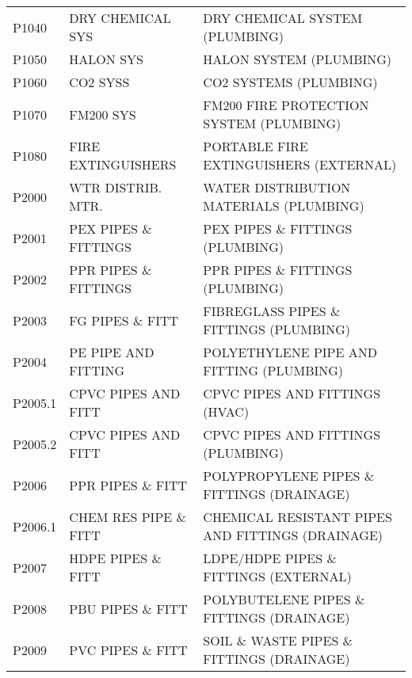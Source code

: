 \begin{longtable}[l]{l%
                  l|%
                  l|}
\rowcolor{thetableheadbgcolor!0.25!white} P1040       & DRY CHEMICAL SYS   & DRY CHEMICAL SYSTEM (PLUMBING)   \\
\rowcolor{thetableheadbgcolor!0.25!white} P1050       & HALON SYS   & HALON SYSTEM (PLUMBING)   \\
\rowcolor{thetableheadbgcolor!0.25!white} P1060       & CO2 SYSS   & CO2 SYSTEMS (PLUMBING)   \\
\rowcolor{thetableheadbgcolor!0.25!white} P1070       & FM200  SYS   & FM200 FIRE PROTECTION SYSTEM (PLUMBING)   \\
\rowcolor{thetableheadbgcolor!0.25!white} P1080       & FIRE EXTINGUISHERS   & PORTABLE FIRE EXTINGUISHERS (EXTERNAL)   \\
\rowcolor{thetableheadbgcolor!0.25!white} P2000       & WTR DISTRIB. MTR.   & WATER DISTRIBUTION MATERIALS (PLUMBING)   \\
\rowcolor{thetableheadbgcolor!0.25!white} P2001       & PEX PIPES \& FITTINGS   & PEX PIPES \& FITTINGS (PLUMBING)   \\
\rowcolor{thetableheadbgcolor!0.25!white} P2002       & PPR PIPES \& FITTINGS   & PPR PIPES \& FITTINGS (PLUMBING)   \\
\rowcolor{thetableheadbgcolor!0.25!white} P2003       & FG PIPES \& FITT   & FIBREGLASS PIPES \& FITTINGS (PLUMBING)   \\
\rowcolor{thetableheadbgcolor!0.25!white} P2004       & PE PIPE AND FITTING   & POLYETHYLENE PIPE AND FITTING (PLUMBING)   \\
\rowcolor{thetableheadbgcolor!0.25!white} P2005.1     & CPVC PIPES AND FITT   & CPVC PIPES AND FITTINGS (HVAC)   \\
\rowcolor{thetableheadbgcolor!0.25!white} P2005.2     & CPVC PIPES AND FITT   & CPVC PIPES AND FITTINGS (PLUMBING)   \\
\rowcolor{thetableheadbgcolor!0.25!white} P2006       & PPR PIPES \& FITT   & POLYPROPYLENE PIPES \& FITTINGS (DRAINAGE)   \\
\rowcolor{thetableheadbgcolor!0.25!white} P2006.1     & CHEM RES PIPE \& FITT   & CHEMICAL RESISTANT PIPES AND FITTINGS (DRAINAGE)   \\
\rowcolor{thetableheadbgcolor!0.25!white} P2007       & HDPE PIPES \& FITT   & LDPE/HDPE PIPES \& FITTINGS (EXTERNAL)   \\
\rowcolor{thetableheadbgcolor!0.25!white} P2008       & PBU PIPES \& FITT   & POLYBUTELENE PIPES \& FITTINGS (DRAINAGE)   \\
\rowcolor{thetableheadbgcolor!0.25!white} P2009       & PVC PIPES \& FITT   & SOIL \& WASTE PIPES \& FITTINGS (DRAINAGE)   \\

\end{longtable}
